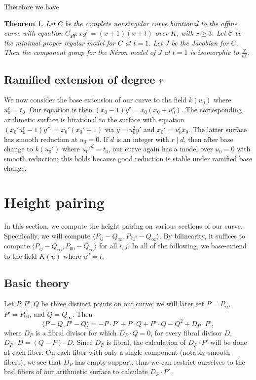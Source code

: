\documentclass[reqno]{amsart}
\newtheorem{theorem}{Theorem}[section]
\theoremstyle{definition}
\theoremstyle{remark}
\newcommand{\sy}{\bar{y}}
\def\Z{\mathbb{Z}}
\def\scd{\mathscr{C}}
\def\caff{C_{\textsf{aff}}}
\begin{document}
Therefore we have
\begin{theorem}
  Let $C$ be the complete nonsingular curve birational to the affine curve with equation $\caff:x\sy^r = (x+1)(x+t)$ over $K$, with $r \geq 3$. Let $\scd$ be the minimal proper regular model for $C$ at $t = 1$. Let $J$ be the Jacobian for $C$. Then the component group for the N\'eron model of $J$ at $t = 1$ is isomorphic to
  $
  \frac{\Z}{r\Z}.
  $
\end{theorem}

\subsection{Ramified extension of degree $r$}
\label{sec:ramif-extens-degr}

We now consider the base extension of our curve to the field $k(u_0)$ where $u_0^r = t_0$. Our equation is then $(x_0 - 1)\sy^r = x_0(x_0 + u_0^r)$. The corresponding arithmetic surface is birational to the surface with equation $(x_0'u_0^r - 1)\sy'^r = x_0'(x_0' + 1)$ via $\sy = u_0^2 \sy'$ and $x_0' = u_0^r x_0$. The latter surface has smooth reduction at $u_0 = 0$. If $d$ is an integer with $r \mid d$, then after base change to $k(u_0')$ where $u_0'^d = t_0$, our curve again has a model over $u_0 = 0$ with smooth reduction; this holds because good reduction is stable under ramified base change. 

\section{Height pairing}
\label{sec:height-pairing}

In this section, we compute the height pairing on various sections of our curve. Specifically, we will compute $\langle P_{ij} - Q_\infty, P_{i' j'} - Q_\infty \rangle$. By bilinearity, it suffices to compute $\langle P_{ij} - Q_\infty, P_{00} - Q_\infty \rangle$ for all $i,j$. In all of the following, we base-extend to the field $K(u)$ where $u^d = t$.

\subsection{Basic theory}
\label{sec:basic-theory}

Let $P, P', Q$ be three distinct points on our curve; we will later set $P = P_{ij}$, $P' = P_{00}$, and $Q = Q_\infty$. Then
\[
\langle P - Q, P' - Q\rangle = -P \cdot P' + P \cdot Q + P' \cdot Q - Q^2 + D_P \cdot P',
\]
 where $D_P$ is a fibral divisor for which $D_P \cdot Q = 0$, for every fibral divisor $D$, $D_P \cdot D = (Q - P) \cdot D$. Since $D_P$ is fibral, the calculation of $D_P \cdot P'$ will be done at each fiber. On each fiber with only a single component (notably smooth fibers), we see that $D_P$ has empty support; thus we can restrict ourselves to the bad fibers of our arithmetic surface to calculate $D_P \cdot P'$. 
\end{document}
